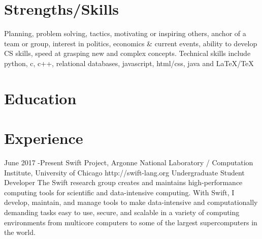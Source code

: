 \documentclass[10pt]{article} %
\begin{document}

\section{Strengths/Skills}

{Planning, problem solving, tactics, motivating or inspiring others, anchor of a team or group, interest in politics, economics \& current events, ability to develop CS skills, speed at grasping new and complex concepts. Technical skills include python, c, c++, relational databases, javascript, html/css, java and \LaTeX/\TeX}


\section{Education}






\section{Experience}
\job
{June 2017 -}{Present}
{Swift Project, Argonne National Laboratory / Computation Institute, University of Chicago}
{http://swift-lang.org}
{Undergraduate Student Developer}
{The Swift research group creates and maintains high-performance computing tools for scientific and data-intensive computing. With Swift, I develop, maintain, and manage tools to make data-intensive and computationally demanding tasks easy to use, secure, and scalable in a variety of computing environments from multicore computers to some of the largest supercomputers in the world.}
\end{document}
